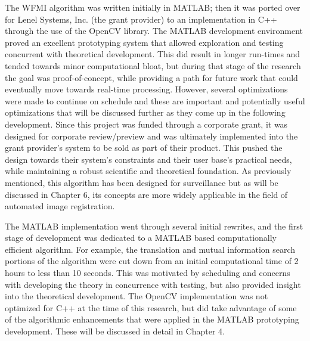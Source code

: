 %
%
%
%
%
%
%
%
%

%
%
%



The WFMI algorithm was written initially in MATLAB\textsuperscript{\textregistered}; then it was ported over for Lenel Systems, Inc. (the grant provider) to an implementation in C++ through the use of the OpenCV library. The MATLAB\textsuperscript{\textregistered} development environment proved an excellent prototyping system that allowed exploration and testing concurrent with theoretical development. This did result in longer run-times and tended towards minor computational bloat, but during that stage of the research the goal was proof-of-concept, while providing a path for future work that could eventually move towards real-time processing. However, several optimizations were made to continue on schedule and these are important and potentially useful optimizations that will be discussed further as they come up in the following development. Since this project was funded through a corporate grant, it was designed for corporate review/preview and was ultimately implemented into the grant provider's system to be sold as part of their product. This pushed the design towards their system's constraints and their user base's practical needs, while maintaining a robust scientific and theoretical foundation. As previously mentioned, this algorithm has been designed for surveillance but as will be discussed in Chapter 6, its concepts are more widely applicable in the field of automated image registration.

The MATLAB\textsuperscript{\textregistered} implementation went through several initial rewrites, and the first stage of development was dedicated to a MATLAB\textsuperscript{\textregistered} based computationally efficient algorithm. For example, the translation and mutual information search portions of the algorithm were cut down from an initial computational time of 2 hours to less than 10 seconds. This was motivated by scheduling and concerns with developing the theory in concurrence with testing, but also provided insight into the theoretical development. The OpenCV implementation was not optimized for C++ at the time of this research, but did take advantage of some of the algorithmic enhancements that were applied in the MATLAB\textsuperscript{\textregistered} prototyping development. These will be discussed in detail in Chapter 4.

